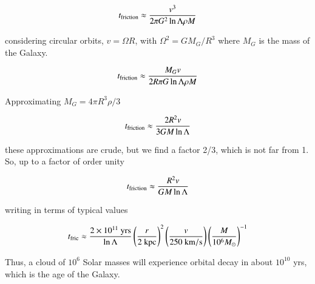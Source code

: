 \begin{equation}
t_{\rm friction} \approx \frac{v^3}{2 \pi G^2 \ln\Lambda \rho M } 
\end{equation}


considering circular orbits, $v = \Omega R$, with $\Omega^2 = GM_G/R^3$ where $M_G$ is the mass of the Galaxy. 

\begin{equation}
t_{\rm friction} \approx \frac{M_G v}{2 R \pi G \ln\Lambda \rho M } 
\end{equation}


Approximating $M_G = 4\pi R^3 \rho/3$ 

\begin{equation}
t_{\rm friction} \approx \frac{2 R^2 v}{3 GM \ln\Lambda  } 
\end{equation}

these approximations are crude, but we find a factor 2/3, which is not far from 1. So, up to a factor of order unity

\begin{equation}
t_{\rm friction} \approx \frac{R^2 v}{GM \ln\Lambda } 
\end{equation}

writing in terms of typical values 

\begin{equation}
t_{\rm fric} \approx \frac{2 \times 10^{11} \ \mathrm{yrs}}{\ln\Lambda} \left(\frac{r}{2 \ \mathrm{kpc}}\right)^2 \left(\frac{v}{250 \ \mathrm{km/s}}\right) \left(\frac{M}{10^6 M_\odot}\right)^{-1}
\end{equation}

Thus, a cloud of $10^6$ Solar masses will experience orbital decay in about $10^{10}$ yrs, which is the age of the Galaxy.

